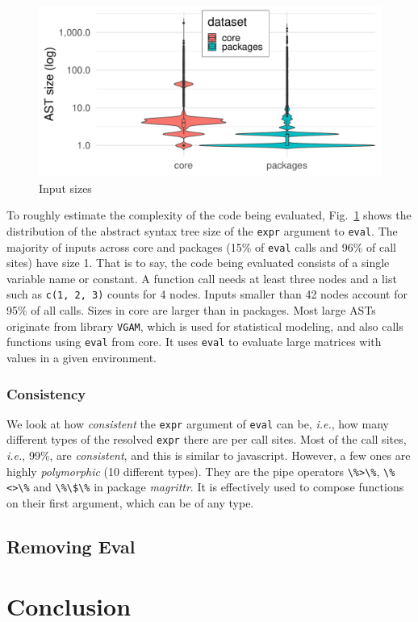 \documentclass[a4paper,USenglish,cleveref, autoref, thm-restate]{lipics-v2019}
\newcommand{\NbAstOnePercent}{15\%\xspace}
\newcommand{\NbAstOneCallSitePercent}{96\%\xspace}
\newcommand{\AstSizeNineFive}{42\xspace}
\newcommand{\PercentMonomorphic}{99\%\xspace}
\newcommand{\ie}{\emph{i.e.},\xspace}
\newcommand{\eval}{\texttt{eval}\xspace}
\renewcommand{\c}[1]{\lstinline{#1}\xspace}
\begin{document}
\begin{figure}[!b]
	\centering
  \includegraphics[width=\columnwidth]{ast_sizes}
  \caption{Input sizes} \label{fig:ast-size}
\end{figure}

To roughly estimate the complexity of the code being evaluated,
Fig.~\ref{fig:ast-size} shows the distribution of the abstract syntax tree
size of the \c{expr} argument to \eval. The majority of inputs across core
and packages (\NbAstOnePercent of \eval calls and \NbAstOneCallSitePercent
of call sites) have size 1. That is to say, the code being evaluated
consists of a single variable name or constant. A function call needs at
least three nodes and a list such as \c{c(1, 2, 3)} counts for 4
nodes. Inputs smaller than \AstSizeNineFive nodes account for 95\% of all
calls. Sizes in core are larger than in packages. Most large ASTs originate
from library \c{VGAM}, which is used for statistical modeling, and also calls functions using \eval from core. It uses
\eval to evaluate large matrices with values in a given environment.

\subsubsection{Consistency}

We look at how \emph{consistent} the \c{expr} argument of \eval can be, \ie
how many different types of the resolved \c{expr} there are per call
sites. Most of the call sites, \ie \PercentMonomorphic, are
\emph{consistent}, and this is similar to javascript. However, a few ones
are highly \emph{polymorphic} (10 different types). They are the pipe
operators \c{\%>\%}, \c{\%<>\%} and \c{\%\$\%} in package \emph{magrittr}. It
is effectively used to compose functions on their first argument, which can
be of any type.



\subsection{Removing Eval}



\section{Conclusion}


\end{document}

